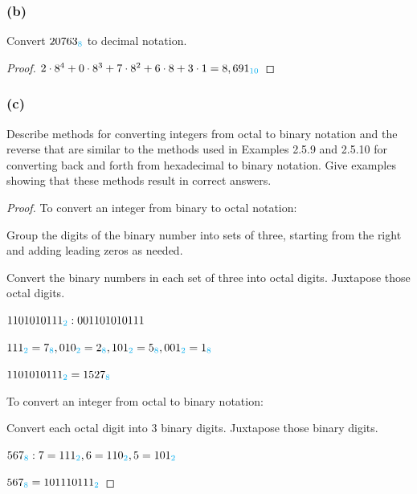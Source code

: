\documentclass[14pt]{extarticle}
\newcommand{\base}[1]{{\color{cyan}#1}}
\begin{document}
\subsubsection{(b)} 
Convert $20763_\base{8}$ to decimal notation.

\begin{proof} 
$2\cdot8^4 + 0\cdot8^3 + 7\cdot8^2 + 6\cdot8 + 3\cdot1 = 8,691_\base{10}$ 
\end{proof}

\subsubsection{(c)}
Describe methods for converting integers from octal to binary notation and the reverse that are similar to the methods used in Examples 2.5.9 and 2.5.10 for converting back and forth from hexadecimal to binary notation. Give examples showing that these methods result in correct answers.

\begin{proof} 
To convert an integer from binary to octal notation: 

Group the digits of the binary number into sets of three, starting from the right and adding leading zeros as needed.

Convert the binary numbers in each set of three into octal digits. Juxtapose those octal digits.

$1101010111_\base{2}: 001 101 010 111$ 

$111_\base{2} = 7_\base{8}, 010_\base{2} = 2_\base{8}, 101_\base{2} = 5_\base{8}, 001_\base{2} = 1_\base{8}$

$1101010111_\base{2} = 1527_\base{8}$

To convert an integer from octal to binary notation:

Convert each octal digit into 3 binary digits. Juxtapose those binary digits.

$567_\base{8}:  7 = 111_\base{2}, 6 = 110_\base{2}, 5 = 101_\base{2}$

$567_\base{8} = 101110111_\base{2}$ 
\end{proof}
\end{document}
